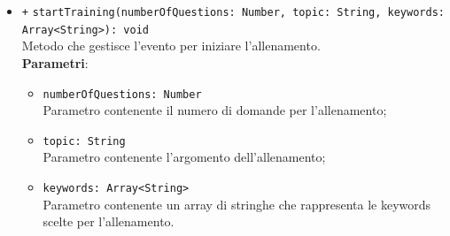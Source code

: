 \begin{itemize}
\begin{itemize}
\begin{itemize}
		\end{itemize}
		\item \texttt{+} \texttt{startTraining(numberOfQuestions: Number, topic: String, keywords:\\ Array<String>): void} \\
		Metodo che gestisce l'evento per iniziare l'allenamento. \\
		\textbf{Parametri}:
		\begin{itemize}
			\item \texttt{numberOfQuestions: Number} \\
			Parametro contenente il numero di domande per l'allenamento;
			\item \texttt{topic: String} \\
			Parametro contenente l'argomento dell'allenamento;
			\item \texttt{keywords: Array<String>} \\
			Parametro contenente un array di stringhe che rappresenta le keywords scelte per l'allenamento.
		\end{itemize}
	\end{itemize}
\end{itemize}

